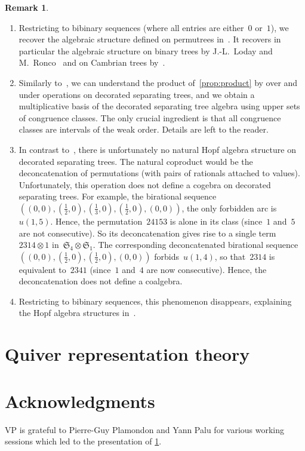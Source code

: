 \documentclass{amsart}
\theoremstyle{definition}
\newtheorem{remark}[theorem]{Remark}
\newcommand{\f}[1]{{\mathfrak{#1}}} %
\begin{document}
\begin{remark}
\begin{enumerate}
\item Restricting to bibinary sequences (where all entries are either~$0$ or~$1$), we recover the algebraic structure defined on permutrees in~\cite{PilaudPons-permutrees}. It recovers in particular the algebraic structure on binary trees by J.-L.~Loday and M.~Ronco~\cite{LodayRonco} and on Cambrian trees by~\cite{ChatelPilaud}.
\item Similarly to~\cite{ChatelPilaud, PilaudPons-permutrees}, we can understand the product of~\cref{prop:product} by over and under operations on decorated separating trees, and we obtain a multiplicative basis of the decorated separating tree algebra using upper sets of congruence classes. The only crucial ingredient is that all congruence classes are intervals of the weak order. Details are left to the reader.
\item In contrast to~\cite{LodayRonco, ChatelPilaud, PilaudPons-permutrees}, there is unfortunately no natural Hopf algebra structure on decorated separating trees. The natural coproduct would be the deconcatenation of permutations (with pairs of rationals attached to values). Unfortunately, this operation does not define a cogebra on decorated separating trees. For example, the birational sequence~$((0,0), (\frac12,0), (\frac13,0), (\frac12,0), (0,0))$, the only forbidden arc is~$u(1,5)$. Hence, the permutation~$24153$ is alone in its class (since~$1$ and~$5$ are not consecutive). So its deconcatenation gives rise to a single term~$2314 \otimes 1$ in~$\f{S}_4 \otimes \f{S}_1$. The corresponding deconcatenated birational sequence~$((0,0), (\frac12,0), (\frac12,0), (0,0))$ forbids~$u(1,4)$, so that~$2314$ is equivalent to~$2341$ (since~$1$ and~$4$ are now consecutive). Hence, the deconcatenation does not define a coalgebra.
\item Restricting to bibinary sequences, this phenomenon disappears, explaining the Hopf algebra structures in~\cite{LodayRonco, ChatelPilaud, PilaudPons-permutrees}.
\end{enumerate}
\end{remark}


\section{Quiver representation theory}
\label{subsec:representationTheory}


\section*{Acknowledgments}

VP is grateful to Pierre-Guy Plamondon and Yann Palu for various working sessions which led to the presentation of \cref{subsec:representationTheory}.




\label{sec:biblio}
\end{document}
